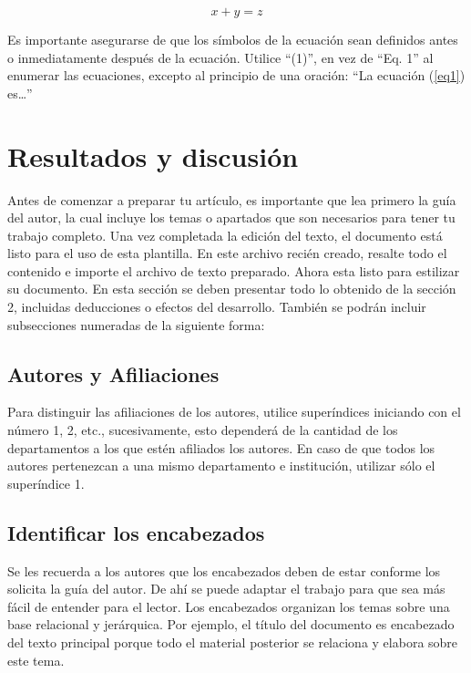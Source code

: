 \begin{equation}
    \label{eq1}
    x + y = z 
\end{equation}

Es importante asegurarse de que los símbolos de la ecuación sean definidos antes o inmediatamente después de la ecuación. Utilice “(1)”, en vez de “Eq. 1” al enumerar las ecuaciones, excepto al principio de una oración: “La ecuación (\ref{eq1}) es…”

\section{Resultados y discusión}

Antes de comenzar a preparar tu artículo, es importante que lea primero la guía del autor, la cual incluye los temas o apartados que son necesarios para tener tu trabajo completo.
Una vez completada la edición del texto, el documento está listo para el uso de esta plantilla. En este archivo recién creado, resalte todo el contenido e importe el archivo de texto preparado. Ahora esta listo para estilizar su documento.
En esta sección se deben presentar todo lo obtenido de la sección 2, incluidas deducciones o efectos del desarrollo. También se podrán incluir subsecciones numeradas de la siguiente forma:

\subsection{Autores y Afiliaciones}

Para distinguir las afiliaciones de los autores, utilice superíndices iniciando con el número 1, 2, etc., sucesivamente, esto dependerá de la cantidad de los departamentos a los que estén afiliados los autores. En caso de que todos los autores pertenezcan a una mismo departamento e institución, utilizar sólo el superíndice 1. 

\subsection{Identificar los encabezados}

Se les recuerda a los autores que los encabezados deben de estar conforme los solicita la guía del autor. De ahí se puede adaptar el trabajo para que sea más fácil de entender para el lector.
Los encabezados organizan los temas sobre una base relacional y jerárquica. Por ejemplo, el título del documento es encabezado del texto principal porque todo el material posterior se relaciona y elabora sobre este tema. 

